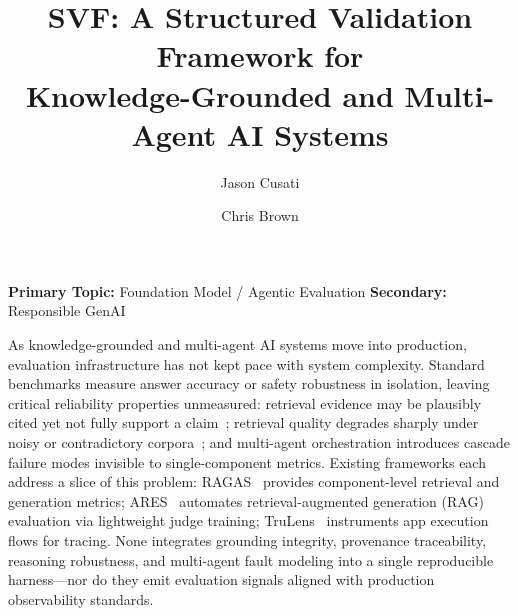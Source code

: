 \documentclass[conference, 10pt]{IEEEtran}
\title{SVF: A Structured Validation Framework for\\Knowledge-Grounded and Multi-Agent AI Systems}
\author{Jason Cusati \and Chris Brown}
\date{}
\begin{document}
\maketitle
\thispagestyle{empty}

\vspace{-1.5em}

\noindent\textbf{Primary Topic:} Foundation Model / Agentic Evaluation \hfill
\textbf{Secondary:} Responsible GenAI

\vspace{0.5em}

As knowledge-grounded and multi-agent AI systems move into production, evaluation infrastructure has not kept pace with system complexity. Standard benchmarks measure answer accuracy or safety robustness in isolation, leaving critical reliability properties unmeasured: retrieval evidence may be plausibly cited yet not fully support a claim~\cite{Ji2023HallucinationSurvey}; retrieval quality degrades sharply under noisy or contradictory corpora~\cite{Yan2024CRAG}; and multi-agent orchestration introduces cascade failure modes invisible to single-component metrics. Existing frameworks each address a slice of this problem: RAGAS~\cite{Es2023RAGAS} provides component-level retrieval and generation metrics; ARES~\cite{SaadFalcon2024ARES} automates retrieval-augmented generation (RAG) evaluation via lightweight judge training; TruLens~\cite{TruLensGitHub} instruments app execution flows for tracing. None integrates grounding integrity, provenance traceability, reasoning robustness, and multi-agent fault modeling into a single reproducible harness---nor do they emit evaluation signals aligned with production observability standards.
\end{document}
